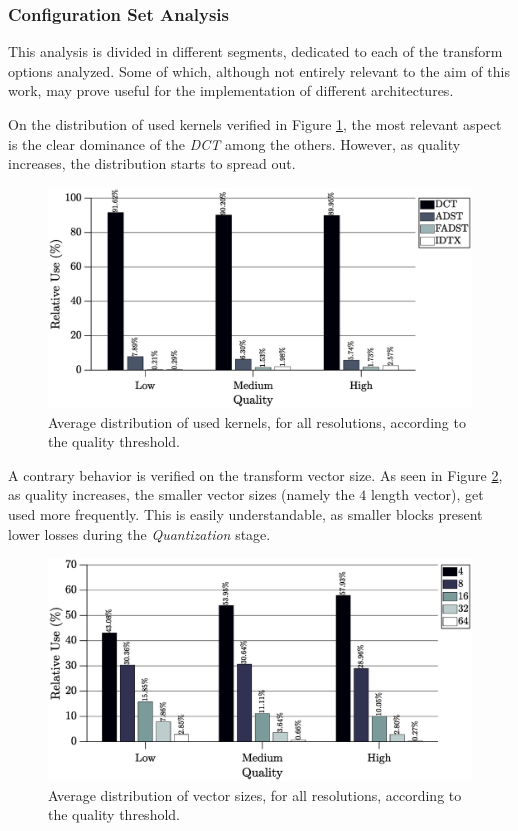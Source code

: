 \subsubsection{Configuration Set Analysis}

This analysis is divided in different segments, dedicated to each of the transform options analyzed. Some of which, although not entirely relevant to the aim of this work, may prove useful for the implementation of different architectures.

On the distribution of used kernels verified in Figure \ref{fig:kernelavg}, the most relevant aspect is the clear dominance of the \emph{DCT} among the others. However, as quality increases, the distribution starts to spread out.

\begin{figure}[!htpb]
    \centering
    \includegraphics[width=\textwidth]{Sections/3Transforms/Images/kernelAvg.eps}
    \caption{Average distribution of used kernels, for all resolutions, according to the quality threshold.}
    \label{fig:kernelavg}
\end{figure}

A contrary behavior is verified on the transform vector size. As seen in Figure \ref{fig:sizeavg}, as quality increases, the smaller vector sizes (namely the $4$ length vector), get used more frequently. This is easily understandable, as smaller blocks present lower losses during the \emph{Quantization} stage. 

\begin{figure}[!htpb]
    \centering
    \includegraphics[width=\textwidth]{Sections/3Transforms/Images/vectSizAvg.eps}
    \caption{Average distribution of vector sizes, for all resolutions, according to the quality threshold.}
    \label{fig:sizeavg}
\end{figure}

